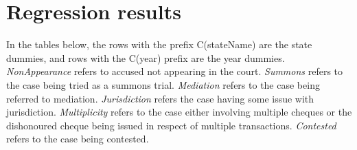 \section{Regression results}
\label{sec:regression-results-1}
In the tables below, the rows with the prefix C(stateName) are the state dummies, and rows with the C(year) prefix are the year dummies. \emph{NonAppearance} refers to accused not appearing in the court. \emph{Summons} refers to the case being tried as a summons trial. \emph{Mediation} refers to the case being referred to mediation. \emph{Jurisdiction} refers the case having some issue with jurisdiction. \emph{Multiplicity} refers to the case either involving multiple cheques or the dishonoured cheque being issued in respect of multiple transactions. \emph{Contested} refers to the case being contested.

